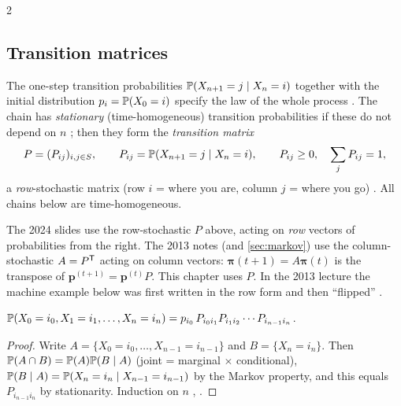 \begin{paracol}{2}
\subsection{Transition matrices}
The one-step transition probabilities $\mathbb{P}(X_{n+1}=j\mid X_n=i)$ together with the initial
distribution $p_i=\mathbb{P}(X_0=i)$ specify the law of the whole process . The chain has
\emph{stationary} (time-homogeneous) transition probabilities if these do not depend on $n$
; then they form the \emph{transition matrix}
\[
  P=(P_{ij})_{i,j\in S},\qquad P_{ij}=\mathbb{P}(X_{n+1}=j\mid X_n=i),\qquad P_{ij}\ge0,\quad \sum_{j}P_{ij}=1,
\]
a \emph{row}-stochastic matrix (row $i$ = where you are, column $j$ = where you go) .
All chains below are time-homogeneous.

\begin{coursenote}
The 2024 slides use the row-stochastic $P$ above, acting on
\emph{row} vectors of probabilities from the right. The 2013 notes (and
\cref{sec:markov}) use the column-stochastic $A=P^{\mathsf T}$ acting on column
vectors: $\bm\pi(t+1)=A\bm\pi(t)$ is the transpose of
$\bm p^{(t+1)}=\bm p^{(t)}P$. This chapter uses $P$. In the 2013
lecture the machine example below was first written in the row form
and then ``flipped'' .
\end{coursenote}

\begin{proposition}\label{ch04:prop-path}
$\mathbb{P}(X_0=i_0,X_1=i_1,\dots,X_n=i_n)=p_{i_0}\,P_{i_0i_1}P_{i_1i_2}\cdots P_{i_{n-1}i_n}$.
\end{proposition}
\begin{proof}
Write $A=\{X_0=i_0,\dots,X_{n-1}=i_{n-1}\}$ and $B=\{X_n=i_n\}$. Then $\mathbb{P}(A\cap B)=\mathbb{P}(A)\mathbb{P}(B\mid A)$
(joint = marginal $\times$ conditional), $\mathbb{P}(B\mid A)=\mathbb{P}(X_n=i_n\mid X_{n-1}=i_{n-1})$ by the Markov
property, and this equals $P_{i_{n-1}i_n}$ by stationarity. Induction on $n$ , .
\end{proof}


\end{paracol}
